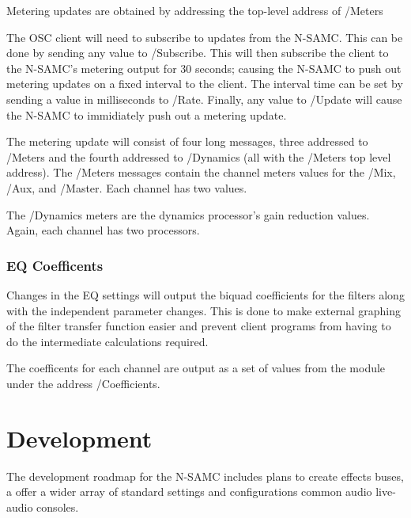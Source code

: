\documentclass[letterpaper, 12pt, twosided, twocolumn]{article}
\begin{document}
Metering updates are obtained by addressing the top-level address of /Meters

The OSC client will need to subscribe to updates from the N-SAMC. This can be done by sending any value to /Subscribe. This will then subscribe the client to the N-SAMC's metering output for 30 seconds; causing the N-SAMC to push out metering updates on a fixed interval to the client. The interval time can be set by sending a value in milliseconds to /Rate. Finally, any value to /Update will cause the N-SAMC to immidiately push out a metering update.

The metering update will consist of four long messages, three addressed to /Meters and the fourth addressed to /Dynamics (all with the /Meters top level address). The /Meters messages contain the channel meters values for the /Mix, /Aux, and /Master. Each channel has two values.

The /Dynamics meters are the dynamics processor's gain reduction values. Again, each channel has two processors. 

\subsubsection{EQ Coefficents}

Changes in the EQ settings will output the biquad coefficients for the filters along with the independent parameter changes. This is done to make external graphing of the filter transfer function easier and prevent client programs from having to do the intermediate calculations required.

The coefficents for each channel are output as a set of values from the module under the address /Coefficients.

\section{Development}

The development roadmap for the N-SAMC includes plans to create effects buses, a offer a wider array of standard settings and configurations common audio live-audio consoles. 
\end{document}
